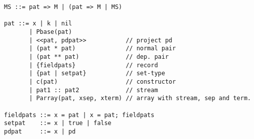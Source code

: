 {\small
\begin{verbatim}
MS ::= pat => M | (pat => M | MS)

pat ::= x | k | nil
       | Pbase(pat)
       | <<pat, pdpat>>           // project pd
       | (pat * pat)              // normal pair
       | (pat ** pat)             // dep. pair
       | {fieldpats}              // record
       | {pat | setpat}           // set-type
       | c(pat)                   // constructor
       | pat1 :: pat2             // stream
       | Parray(pat, xsep, xterm) // array with stream, sep and term.

fieldpats ::= x = pat | x = pat; fieldpats
setpat    ::= x | true | false
pdpat     ::= x | pd
\end{verbatim}
}
